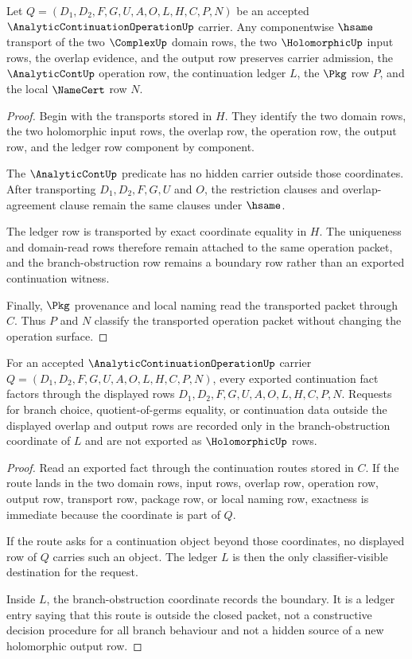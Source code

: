 \begin{theorem}
\label{thm:analytic-continuation-operation-stability}
Let $Q=(D_1,D_2,F,G,U,A,O,L,H,C,P,N)$ be an accepted $\AnalyticContinuationOperationUp$ carrier. Any componentwise $\hsame$ transport of the two $\ComplexUp$ domain rows, the two $\HolomorphicUp$ input rows, the overlap evidence, and the output row preserves carrier admission, the $\AnalyticContUp$ operation row, the continuation ledger $L$, the $\Pkg$ row $P$, and the local $\NameCert$ row $N$.
\end{theorem}
\begin{proof}
Begin with the transports stored in $H$. They identify the two domain rows, the two holomorphic input rows, the overlap row, the operation row, the output row, and the ledger row component by component.

The $\AnalyticContUp$ predicate has no hidden carrier outside those coordinates. After transporting $D_1,D_2,F,G,U$ and $O$, the restriction clauses and overlap-agreement clause remain the same clauses under $\hsame$.

The ledger row is transported by exact coordinate equality in $H$. The uniqueness and domain-read rows therefore remain attached to the same operation packet, and the branch-obstruction row remains a boundary row rather than an exported continuation witness.

Finally, $\Pkg$ provenance and local naming read the transported packet through $C$. Thus $P$ and $N$ classify the transported operation packet without changing the operation surface.
\end{proof}

\begin{theorem}
\label{thm:analytic-continuation-operation-ledger-exactness}
For an accepted $\AnalyticContinuationOperationUp$ carrier $Q=(D_1,D_2,F,G,U,A,O,L,H,C,P,N)$, every exported continuation fact factors through the displayed rows $D_1,D_2,F,G,U,A,O,L,H,C,P,N$. Requests for branch choice, quotient-of-germs equality, or continuation data outside the displayed overlap and output rows are recorded only in the branch-obstruction coordinate of $L$ and are not exported as $\HolomorphicUp$ rows.
\end{theorem}
\begin{proof}
Read an exported fact through the continuation routes stored in $C$. If the route lands in the two domain rows, input rows, overlap row, operation row, output row, transport row, package row, or local naming row, exactness is immediate because the coordinate is part of $Q$.

If the route asks for a continuation object beyond those coordinates, no displayed row of $Q$ carries such an object. The ledger $L$ is then the only classifier-visible destination for the request.

Inside $L$, the branch-obstruction coordinate records the boundary. It is a ledger entry saying that this route is outside the closed packet, not a constructive decision procedure for all branch behaviour and not a hidden source of a new holomorphic output row.
\end{proof}

